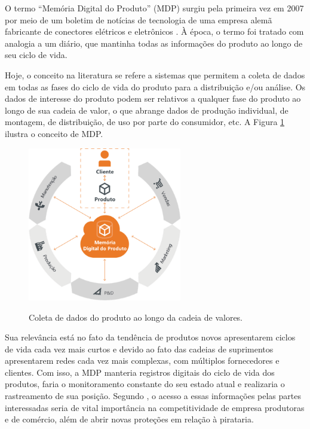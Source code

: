 \documentclass[
	12pt,				%
	oneside,			%
	a4paper,			%
	english,			%
	brazil				%
]{abntex2}
\begin{document}
	O termo ``Memória Digital do Produto'' (MDP) surgiu pela primeira vez em 2007 por meio de um boletim de notícias de tecnologia de uma empresa alemã fabricante de conectores elétricos e eletrônicos \cite{wahlster2007digitalmemory}. À época, o termo foi tratado com analogia a um diário, que mantinha todas as informações do produto ao longo de seu ciclo de vida.

	Hoje, o conceito na literatura se refere a sistemas que permitem a coleta de dados em todas as fases do ciclo de vida do produto para a distribuição e/ou análise. Os dados de interesse do produto podem ser relativos a qualquer fase do produto ao longo de sua cadeia de valor, o que abrange dados de produção individual, de montagem, de distribuição, de uso por parte do consumidor, etc. A Figura \ref{fig:MDP-ideia} ilustra o conceito de MDP.
	 
	\begin{figure}[H]
		\centering
		\caption{Coleta de dados do produto ao longo da cadeia de valores.}
		\includegraphics[width=0.6\textwidth]{MDP-ideia.png}
		\label{fig:MDP-ideia}
	\end{figure}

	Sua relevância está no fato da tendência de produtos novos apresentarem ciclos de vida cada vez mais curtos e devido ao fato das cadeias de suprimentos apresentarem redes cada vez mais complexas, com múltiplos fornecedores e clientes. Com isso, a MDP manteria registros digitais do ciclo de vida dos produtos, faria o monitoramento constante do seu estado atual e realizaria o rastreamento de sua posição. Segundo , o acesso a essas informações pelas partes interessadas seria de vital importância na competitividade de empresa produtoras e de comércio, além de abrir novas proteções em relação à pirataria.
	
\end{document}
